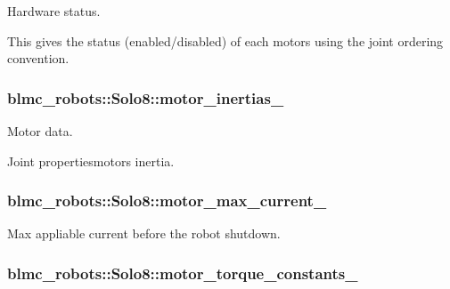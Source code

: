 Hardware status. 

This gives the status (enabled/disabled) of each motors using the joint ordering convention. 
\subsubsection[{\texorpdfstring{motor\+\_\+inertias\+\_\+}{motor_inertias_}}]{ blmc\+\_\+robots\+::\+Solo8\+::motor\+\_\+inertias\+\_\+\hspace{0.3cm}{\ttfamily [private]}}\hypertarget{classblmc__robots_1_1Solo8_ad2a475dd31443243c1683c2fb091418e}{}\label{classblmc__robots_1_1Solo8_ad2a475dd31443243c1683c2fb091418e}


Motor data. 

Joint propertiesmotors inertia. 
\subsubsection[{\texorpdfstring{motor\+\_\+max\+\_\+current\+\_\+}{motor_max_current_}}]{ blmc\+\_\+robots\+::\+Solo8\+::motor\+\_\+max\+\_\+current\+\_\+\hspace{0.3cm}{\ttfamily [private]}}\hypertarget{classblmc__robots_1_1Solo8_af9b0800cd9ef22713767298ef850eddf}{}\label{classblmc__robots_1_1Solo8_af9b0800cd9ef22713767298ef850eddf}


Max appliable current before the robot shutdown. 

\subsubsection[{\texorpdfstring{motor\+\_\+torque\+\_\+constants\+\_\+}{motor_torque_constants_}}]{ blmc\+\_\+robots\+::\+Solo8\+::motor\+\_\+torque\+\_\+constants\+\_\+\hspace{0.3cm}{\ttfamily [private]}}\hypertarget{classblmc__robots_1_1Solo8_a21293b97b37bcd42b3e3766a72fabf26}{}\label{classblmc__robots_1_1Solo8_a21293b97b37bcd42b3e3766a72fabf26}


